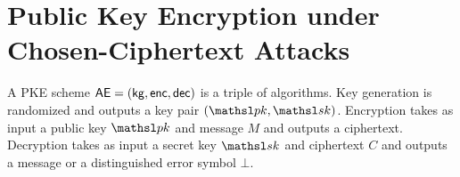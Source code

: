 \section{Public Key Encryption under Chosen-Ciphertext Attacks}
\label{sec:pke}

A PKE scheme $\textsf{AE} = ({\sf kg},{\sf enc},{\sf dec})$ is a triple of
algorithms. Key generation is randomized and outputs a key pair $(\pk,\sk)$.
Encryption
takes as input a public key $\pk$ and message $M$ and outputs a ciphertext.
Decryption takes as input a secret key $\sk$ and ciphertext $C$ and outputs a
message or a distinguished error symbol $\bot$. 







